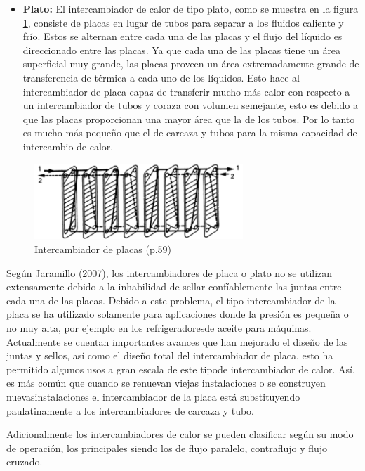 \documentclass[12pt,letterpaper]{article}     %
\begin{document}
\begin{itemize}
\item \textbf{Plato:} El intercambiador de calor de tipo plato, como se muestra en la figura \ref{fig:plato}, consiste de placas en lugar de tubos para separar a los fluidos caliente y frío. Estos se alternan entre cada una de las placas y  el flujo del líquido es direccionado entre las placas. Ya que cada una de las placas tiene un área superficial muy grande, las placas proveen un área extremadamente grande de transferencia de térmica a cada uno de los líquidos. Esto hace al intercambiador de placa capaz de transferir mucho más calor con respecto a un intercambiador de tubos y coraza con volumen semejante, esto es debido a que las placas proporcionan una mayor área que la de los tubos. Por lo tanto es mucho más pequeño que el de carcaza y tubos para la misma capacidad de intercambio de calor.\textbf{}
\end{itemize}

\begin{figure}[H]
\centering
\includegraphics[width=0.7\textwidth]{placas.PNG}
\caption{Intercambiador de placas \cite{Lopez} (p.59)}
\label{fig:plato}
\end{figure}

Según Jaramillo (2007), los intercambiadores de placa o plato no se utilizan extensamente debido a la inhabilidad de sellar confíablemente las juntas entre cada una de las placas. Debido a este problema, el tipo intercambiador de la placa se ha utilizado solamente para aplicaciones donde la presión es pequeña o no muy alta, por ejemplo en los refrigeradoresde aceite para máquinas. Actualmente se cuentan importantes avances que han mejorado el diseño de las juntas y sellos, así como el diseño total del intercambiador de placa, esto ha permitido algunos usos a gran escala de este tipode intercambiador de calor. Así, es más común que cuando se renuevan viejas instalaciones o se construyen nuevasinstalaciones el intercambiador de la placa está substituyendo paulatinamente a los intercambiadores de carcaza y tubo.

Adicionalmente los intercambiadores de calor se pueden clasificar según su modo de operación, los principales siendo los de flujo paralelo, contraflujo y flujo cruzado.
\end{document}
